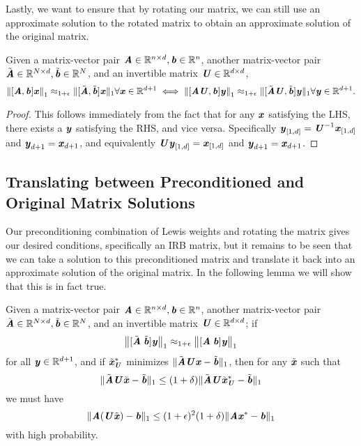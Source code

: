 Lastly, we want to ensure that by rotating our matrix, we can still use an approximate solution to the rotated matrix to obtain an approximate solution of the original matrix.

\begin{lemma}\label{lem:approxStillGoodWithRotation}
	Given a matrix-vector pair $\AA \in \R^{n \times d}, \bb \in \R^{n}$,
	another matrix-vector pair $\tilde{\AA} \in \R^{N \times d}, \tilde{\bb} \in \R^{N}$,
	and an invertible matrix $\UU \in \R^{d \times d}$,
	\[\norm{[\AA,\bb]\xx}_1 \approx_{1+\epsilon} \|[\tilde{\AA},\tilde{\bb}]\xx\|_1 \forall \xx \in \R^{d+1} \iff  \norm{[\AA\UU,\bb]\yy}_1 \approx_{1+\epsilon} \|[\tilde{\AA}\UU,\tilde{\bb}]\yy\|_1 \forall \yy \in \R^{d+1}.
	\]
\end{lemma}

\begin{proof}
	This follows immediately from the fact that for any $\xx$ satisfying the LHS,
	there exists a $\yy$ satisfying the RHS, and vice versa.
	Specifically $\yy_{[1,d]} = \UU^{-1}\xx_{[1,d]}$ and $\yy_{d+1} = \xx_{d+1}$, 
	and equivalently $\UU\yy_{[1,d]} = \xx_{[1,d]}$ and $\yy_{d+1} = \xx_{d+1}$.	
\end{proof}

\subsection{Translating between Preconditioned and Original Matrix Solutions}\label{subsec:translateToOriginal}
Our preconditioning combination of Lewis weights and rotating the matrix gives our desired conditions, specifically an IRB matrix, but it remains to be seen that we can take a solution to this preconditioned matrix and translate it back into an approximate solution of the original matrix. In the following lemma we will show that this is in fact true.

\begin{lemma}\label{lem:objectiveApproxAfterLewis}
	Given a matrix-vector pair $\AA \in \R^{n \times d}, \bb \in \R^{n}$,
	another matrix-vector pair $\tilde{\AA} \in \R^{N \times d}, \tilde{\bb} \in \R^{N}$,
	and an invertible matrix $\UU \in \R^{d \times d}$;
	if
	\[ \big\|[\tilde{\AA}\;\tilde{\bb}]\yy\big\|_1 \approx_{1+\epsilon}\big\|[\AA\;\bb]\yy\big\|_1\]
	for all $\yy \in \R^{d+1}$, and
	if $\tilde{\xx}_{\UU}^*$ minimizes $\|\tilde{\AA}\UU\xx - \tilde{\bb}\|_1$, then for any $\tilde{\xx}$ such that 
	\[ \|\tilde{\AA}\UU\tilde{\xx} - \tilde{\bb}\|_1\leq (1 + \delta) \|\tilde{\AA}\UU\tilde{\xx}_{\UU}^* - \tilde{\bb}\|_1 \]
	we must have
	\[
	\|\AA(\UU\tilde{\xx}) - \bb\|_1 \leq (1 + \epsilon)^2(1 + \delta)\|\AA \xx^* - \bb \|_1 \]
	with high probability.	
\end{lemma}


